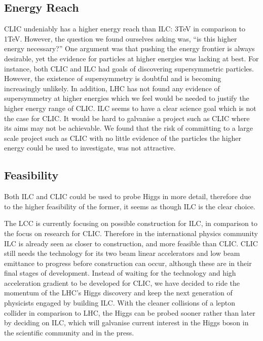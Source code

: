 \subsection{Energy Reach}

CLIC undeniably has a higher energy reach than ILC: 3TeV in comparison to 1TeV. However, the question we found ourselves asking was, ``is this higher energy necessary?''  One argument was that pushing the energy frontier is always desirable, yet the evidence for particles at higher energies was lacking at best. For instance, both CLIC and ILC had goals of discovering supersymmetric particles. However, the existence of supersymmetry is doubtful and is becoming increasingly unlikely. In addition, LHC has not found any evidence of supersymmetry at higher energies which we feel would be needed to justify the higher energy range of CLIC. ILC seems to have a clear science goal which is not the case for CLIC. It would be hard to galvanise a project such as CLIC where its aims may not be achievable. We found that the risk of committing to a large scale project such as CLIC with no little evidence of the particles the higher energy could be used to investigate, was not attractive.

\subsection{Feasibility}

Both ILC and CLIC could be used to probe Higgs in more detail, therefore due to the higher feasibility of the former, it seems as though ILC is the clear choice.

The LCC is currently focusing on possible construction for ILC, in comparison to the focus on research for CLIC. Therefore in the international physics community ILC is already seen as closer to construction, and more feasible than CLIC. CLIC still needs the technology for its two beam linear accelerators and low beam emittance to progress before construction can occur, although these are in their final stages of development. Instead of waiting for the technology and high acceleration gradient to be developed for CLIC, we have decided to ride the momentum of the LHC's Higgs discovery and keep the next generation of physicists engaged by building ILC. With the cleaner collisions of a lepton collider in comparison to LHC, the Higgs can be probed sooner rather than later by deciding on ILC, which will galvanise current interest in the Higgs boson in the scientific community and in the press.